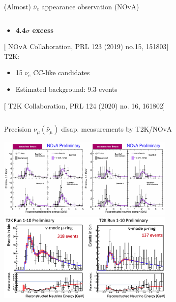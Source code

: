 \begin{frame}{(Almost) $\bar{\nu}_e$ appearance observation (NOvA)}
\begin{columns}[T]
\begin{column}{0.60\textwidth}
\begin{itemize}
         \item {\bf 4.4$\sigma$ excess}
       \end{itemize}
       \vspace{0.2cm}
       [{\color{blue} \scriptsize NOvA Collaboration, PRL 123 (2019) no.15, 151803}]\\
       \vspace{0.5cm}
       T2K:
       \begin{itemize}
         \item 15 $\nu_e$ CC-like candidates
         \item Estimated background: 9.3 events
       \end{itemize}
       \vspace{0.2cm}
       [{\color{blue} \scriptsize T2K Collaboration, PRL 124 (2020) no. 16, 161802}]\\

    \end{column}
  \end{columns}

\end{frame}

%
%
%

\begin{frame}{Precision $\nu_{\mu}(\bar{\nu}_{\mu})$ disap. measurements by T2K/NOvA}

\begin{center}
  \includegraphics[width=0.65\textwidth]{./images/3nu/accelerator/nova_disapp_2020}
  \includegraphics[width=0.65\textwidth]{./images/3nu/accelerator/t2k_disapp_2020_2}
\end{center}

\end{frame}

